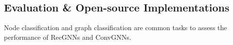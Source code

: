     \subsection{Evaluation \& Open-source Implementations}
    Node classification and graph classification are common tasks to assess the performance of RecGNNs and ConvGNNs. %
    

